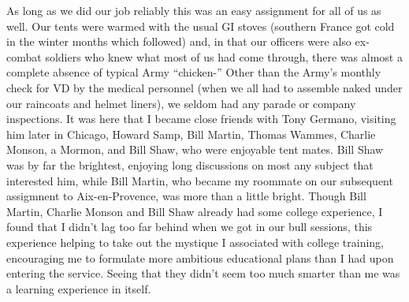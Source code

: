 \documentclass[../m3y]{subfiles}
\begin{document}
As long as we did our job reliably this was an easy assignment for all of us as well. Our tents were warmed with the usual GI stoves (southern France got cold in the winter months which followed) and, in that our officers were also ex-combat soldiers who knew what most of us had come through, there was almost a complete absence of typical Army ``chicken-\underline{\hspace{4em}}'' Other than the Army's monthly check for VD by the medical personnel (when we all had to assemble naked under our raincoats and helmet liners), we seldom had any parade or company inspections. It was here that I became close friends with Tony Germano, visiting him later in Chicago, Howard Samp, Bill Martin, Thomas Wammes, Charlie Monson, a Mormon, and Bill Shaw, who were enjoyable tent mates. Bill Shaw was by far the brightest, enjoying long discussions on most any subject that interested him, while Bill Martin, who became my roommate on our subsequent  assigmnent to Aix-en-Provence, was more than a little bright. Though Bill Martin, Charlie Monson and Bill Shaw already had some college experience, I found that I didn't lag too far behind when we got in our bull sessions, this experience helping to take out the mystique I associated with college training, encouraging me to formulate more ambitious educational plans than I had upon entering the service. Seeing that they didn't seem too much smarter than me was a learning experience in itself.
\end{document}
